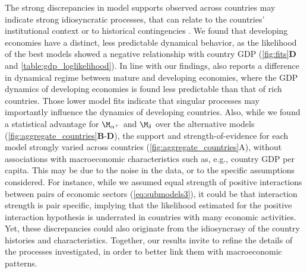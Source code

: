 The strong discrepancies in model supports observed across countries may indicate strong idiosyncratic processes, that can relate to the countries' institutional context \citep{Acemoglu2005} or to historical contingencies \citep{Silverberg2005a}. 
% 
We found that developing economies have a distinct, less predictable dynamical behavior, as the likelihood of the best models showed a negative relationship with country GDP (\cref{fig:fits}\textbf{D} and \cref{table:gdp_loglikelihood}). In line with our findings, \citep{Cristelli2015} also reports a difference in dynamical regime between mature and developing economies, where the GDP dynamics of developing economies is found less predictable than that of rich countries. Those lower model fits indicate that singular processes may importantly influence the dynamics of developing countries.
% 
% 
% 
% 
Also, while we found a statistical advantage for $\modalphap$ and $\moddelta$ over the alternative models (\cref{fig:aggregate_countries}\textbf{B}-\textbf{D}), the support and strength-of-evidence for each model strongly varied across countries (\cref{fig:aggregate_countries}A), without associations with macroeconomic characteristics such as, e.g., country GDP per capita. This may be due to the noise in the data, or to the specific assumptions considered. For instance, while we assumed equal strength of positive interactions between pairs of economic sectors (\cref{eq:submodels3}), it could be that interaction strength is pair specific, implying that the likelihood estimated for the positive interaction hypothesis is underrated in countries with many economic activities. 
% 
Yet, these discrepancies could also originate from the idiosyncrasy of the country histories and characteristics.
% 
Together, our results invite to refine the details of the processes investigated, in order to better link them with macroeconomic patterns.

